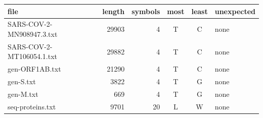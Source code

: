 \begin{tabular}{lrrccl}
\hline
file & length & symbols & most & least & unexpected \\
\hline
SARS-COV-2-MN908947.3.txt & 29903 & 4 & T & C & none \\
SARS-COV-2-MT106054.1.txt & 29882 & 4 & T & C & none \\
gen-ORF1AB.txt & 21290 & 4 & T & C & none \\
gen-S.txt & 3822 & 4 & T & G & none \\
gen-M.txt & 669 & 4 & T & G & none \\
seq-proteins.txt & 9701 & 20 & L & W & none \\
\hline
\end{tabular}